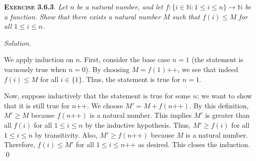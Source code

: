 \documentclass[12pt]{article}
\newcommand{\succr}[1]{#1 \textrm{++}}
\theoremstyle{remark}
\newenvironment{exer}[2]{
    \noindent \setlength{\parskip}{1em}%
    \textsc{\textbf{Exercise #1}}. \textit{#2} \par
    \noindent \textit{Solution.} %
}{\bigskip}
\begin{document}
\begin{exer}{3.6.3}{
    Let $n$ be a natural number, and let $f : \{i \in \mathbb{N} : 1 \le i \le n \} \to \mathbb{N}$ be a function. Show that there exists a natural number $M$ such that $f(i) \le M$ for all $1 \le i \le n$.
}
    We apply induction on $n$.
    First, consider the base case $n = 1$ (the statement is vacuously true when $n = 0$).
    By choosing $M = \succr{f(1)}$, we see that indeed $f(i) \le M$ for all $i \in \{ 1 \}$.
    Thus, the statement is true for $n = 1$.

    Now, suppose inductively that the statement is true for some $n$; we want to show that it is still true for $\succr{n}$.
    We choose $M' =  M + f(\succr{n})$.
    By this definition, $M' \ge M$ because $f(\succr{n})$ is a natural number.
    This implies $M'$ is greater than all $f(i)$ for all $1 \le i \le n$ by the inductive hypothesis.
    Thus, $M' \ge f(i)$ for all $1 \le i \le n$ by transitivity.
    Also, $M' \ge f(\succr{n})$ because $M$ is a natural number.
    Therefore, $f(i) \le M'$ for all $1 \le i \le \succr{n}$ as desired.
    This closes the induction. \qed
\end{exer}
\end{document}
